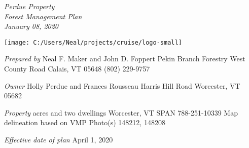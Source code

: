 \documentclass[]{tufte-handout}
\date{}
\begin{document}
\thispagestyle{empty}

\LARGE \emph{Perdue Property}\\
\Large \emph{Forest Management Plan}\\
\Large \emph{January 08, 2020}

\begin{marginfigure}

{\centering \texttt{[image: C:/Users/Neal/projects/cruise/logo-small]} 

}

\end{marginfigure}

\normalsize 

\begin{marginfigure}
\noindent \textit{\large Prepared by} 
\newline\indent Neal F. Maker and John D. Foppert  
\newline\indent Pekin Branch Forestry  
\newline{} West County Road  
\newline\indent Calais, VT 05648  
\newline\indent (802) 229-9757  
\end{marginfigure}

\begin{marginfigure}
\noindent \textit{\large Owner}
\newline\indent Holly Perdue and Frances Rousseau  
\newline{} Harris Hill Road
\indent 
\newline\indent Worcester, VT 05682  
\end{marginfigure}

\begin{marginfigure}
\noindent \textit{\large Property}   
\newline{} acres and two dwellings   
\newline\indent Worcester, VT  
\newline\indent SPAN 788-251-10339  
\newline\indent Map delineation based on VMP  
\newline\indent Photo(s) 148212, 148208  
\end{marginfigure}

\begin{marginfigure}
\noindent \textit{\large Effective date of plan}  
\newline\indent April 1, 2020  
\end{marginfigure}
\end{document}
